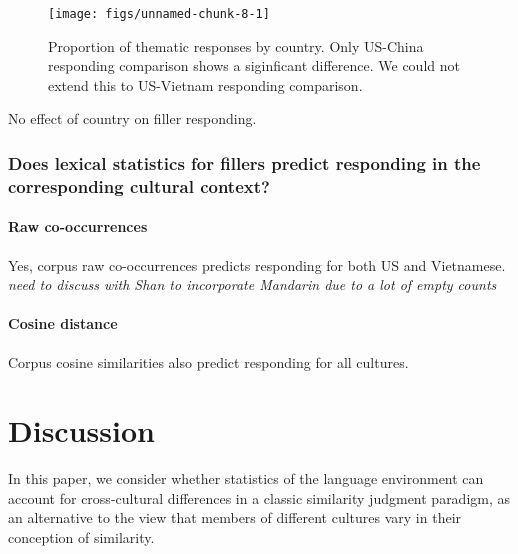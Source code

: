 \documentclass[10pt, letterpaper]{article}
\newenvironment{CodeChunk}{}{}
\begin{document}
\begin{CodeChunk}
\begin{figure}[tb]
\texttt{[image: figs/unnamed-chunk-8-1]} \caption[Proportion of thematic responses by country]{Proportion of thematic responses by country. Only US-China responding comparison shows a siginficant difference. We could not extend this to US-Vietnam responding comparison.}\label{fig:unnamed-chunk-8}
\end{figure}
\end{CodeChunk}

No effect of country on filler responding.

\hypertarget{does-lexical-statistics-for-fillers-predict-responding-in-the-corresponding-cultural-context}{%
\subsubsection{Does lexical statistics for fillers predict responding in
the corresponding cultural
context?}\label{does-lexical-statistics-for-fillers-predict-responding-in-the-corresponding-cultural-context}}

\hypertarget{raw-co-occurrences-1}{%
\paragraph{Raw co-occurrences}\label{raw-co-occurrences-1}}

Yes, corpus raw co-occurrences predicts responding for both US and
Vietnamese. \emph{need to discuss with Shan to incorporate Mandarin due
to a lot of empty counts}

\hypertarget{cosine-distance}{%
\paragraph{Cosine distance}\label{cosine-distance}}

Corpus cosine similarities also predict responding for all cultures.

\hypertarget{discussion}{%
\section{Discussion}\label{discussion}}

In this paper, we consider whether statistics of the language
environment can account for cross-cultural differences in a classic
similarity judgment paradigm, as an alternative to the view that members
of different cultures vary in their conception of similarity.
\end{document}
